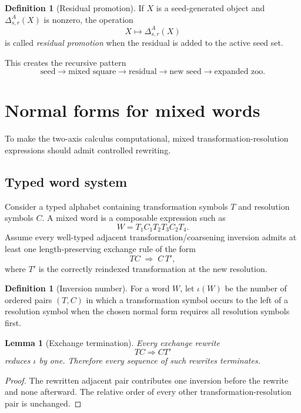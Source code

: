 \documentclass[11pt]{article}
\newtheorem{lemma}[theorem]{Lemma}
\theoremstyle{definition}
\newtheorem{definition}[theorem]{Definition}
\theoremstyle{remark}
\begin{document}
\begin{definition}[Residual promotion]
If $X$ is a seed-generated object and $\Delta^A_{s,r}(X)$ is nonzero, the operation
\[
X\longmapsto\Delta^A_{s,r}(X)
\]
is called \emph{residual promotion} when the residual is added to the active seed set.
\end{definition}

This creates the recursive pattern
\[
\text{seed}
\to
\text{mixed square}
\to
\text{residual}
\to
\text{new seed}
\to
\text{expanded zoo}.
\]

\section{Normal forms for mixed words}

To make the two-axis calculus computational, mixed transformation-resolution expressions should admit controlled rewriting.

\subsection{Typed word system}

Consider a typed alphabet containing transformation symbols $T$ and resolution symbols $C$. A mixed word is a composable expression such as
\[
W=T_1C_1T_2T_3C_2T_4.
\]
Assume every well-typed adjacent transformation/coarsening inversion admits at least one length-preserving exchange rule of the form
\[
TC\;\Rightarrow\;C\,T',
\]
where $T'$ is the correctly reindexed transformation at the new resolution.

\begin{definition}[Inversion number]
For a word $W$, let $\iota(W)$ be the number of ordered pairs $(T,C)$ in which a transformation symbol occurs to the left of a resolution symbol when the chosen normal form requires all resolution symbols first.
\end{definition}

\begin{lemma}[Exchange termination]\label{lem:termination}
Every exchange rewrite
\[
TC\Rightarrow CT'
\]
reduces $\iota$ by one. Therefore every sequence of such rewrites terminates.
\end{lemma}

\begin{proof}
The rewritten adjacent pair contributes one inversion before the rewrite and none afterward. The relative order of every other transformation-resolution pair is unchanged.
\end{proof}
\end{document}
